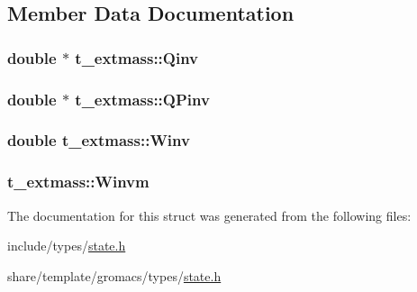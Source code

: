 \subsection{\-Member \-Data \-Documentation}
\hypertarget{structt__extmass_a4eb2f250e880e774e8fa0a29b0cf55cc}{
\subsubsection[{\-Qinv}]{\setlength{\rightskip}{0pt plus 5cm}double $\ast$ {\bf t\-\_\-extmass\-::\-Qinv}}}\label{structt__extmass_a4eb2f250e880e774e8fa0a29b0cf55cc}
\hypertarget{structt__extmass_a8e85d6b0cd63ea4ec8b5b58ad70f9eb1}{
\subsubsection[{\-Q\-Pinv}]{\setlength{\rightskip}{0pt plus 5cm}double $\ast$ {\bf t\-\_\-extmass\-::\-Q\-Pinv}}}\label{structt__extmass_a8e85d6b0cd63ea4ec8b5b58ad70f9eb1}
\hypertarget{structt__extmass_abe556375259538b303361abaa4b4b200}{
\subsubsection[{\-Winv}]{\setlength{\rightskip}{0pt plus 5cm}double {\bf t\-\_\-extmass\-::\-Winv}}}\label{structt__extmass_abe556375259538b303361abaa4b4b200}
\hypertarget{structt__extmass_a9c70bdc08e98387490f2813fd98abb11}{
\subsubsection[{\-Winvm}]{ {\bf t\-\_\-extmass\-::\-Winvm}}}\label{structt__extmass_a9c70bdc08e98387490f2813fd98abb11}


\-The documentation for this struct was generated from the following files\-:\begin{DoxyCompactItemize}
\item 
include/types/\hyperlink{include_2types_2state_8h}{state.\-h}\item 
share/template/gromacs/types/\hyperlink{share_2template_2gromacs_2types_2state_8h}{state.\-h}\end{DoxyCompactItemize}

